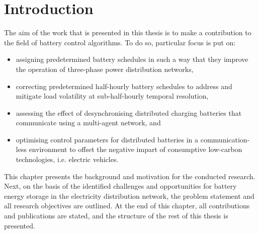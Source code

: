 \chapter{Introduction}
\label{ch-introduction}



The aim of the work that is presented in this thesis is to make a contribution to the field of battery control algorithms.
To do so, particular focus is put on:

\begin{itemize}
	\item assigning predetermined battery schedules in such a way that they improve the operation of three-phase power distribution networks,
	\item correcting predetermined half-hourly battery schedules to address and mitigate load volatility at sub-half-hourly temporal resolution,
	\item assessing the effect of desynchronising distributed charging batteries that communicate using a multi-agent network, and
	\item optimising control parameters for distributed batteries in a communication-less environment to offset the negative impart of consumptive low-carbon technologies, i.e. electric vehicles.
\end{itemize}

This chapter presents the background and motivation for the conducted research.
Next, on the basis of the identified challenges and opportunities for battery energy storage in the electricity distribution network, the problem statement and all research objectives are outlined.
At the end of this chapter, all contributions and publications are stated, and the structure of the rest of this thesis is presented.







